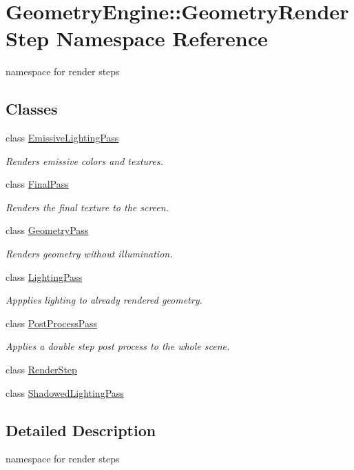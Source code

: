 \hypertarget{namespace_geometry_engine_1_1_geometry_render_step}{}\section{Geometry\+Engine\+::Geometry\+Render\+Step Namespace Reference}
\label{namespace_geometry_engine_1_1_geometry_render_step}


namespace for render steps  


\subsection*{Classes}
\begin{DoxyCompactItemize}
\item 
class \mbox{\hyperlink{class_geometry_engine_1_1_geometry_render_step_1_1_emissive_lighting_pass}{Emissive\+Lighting\+Pass}}
\begin{DoxyCompactList}\small\item\em Renders emissive colors and textures. \end{DoxyCompactList}\item 
class \mbox{\hyperlink{class_geometry_engine_1_1_geometry_render_step_1_1_final_pass}{Final\+Pass}}
\begin{DoxyCompactList}\small\item\em Renders the final texture to the screen. \end{DoxyCompactList}\item 
class \mbox{\hyperlink{class_geometry_engine_1_1_geometry_render_step_1_1_geometry_pass}{Geometry\+Pass}}
\begin{DoxyCompactList}\small\item\em Renders geometry without illumination. \end{DoxyCompactList}\item 
class \mbox{\hyperlink{class_geometry_engine_1_1_geometry_render_step_1_1_lighting_pass}{Lighting\+Pass}}
\begin{DoxyCompactList}\small\item\em Appplies lighting to already rendered geometry. \end{DoxyCompactList}\item 
class \mbox{\hyperlink{class_geometry_engine_1_1_geometry_render_step_1_1_post_process_pass}{Post\+Process\+Pass}}
\begin{DoxyCompactList}\small\item\em Applies a double step post process to the whole scene. \end{DoxyCompactList}\item 
class \mbox{\hyperlink{class_geometry_engine_1_1_geometry_render_step_1_1_render_step}{Render\+Step}}
\item 
class \mbox{\hyperlink{class_geometry_engine_1_1_geometry_render_step_1_1_shadowed_lighting_pass}{Shadowed\+Lighting\+Pass}}
\end{DoxyCompactItemize}


\subsection{Detailed Description}
namespace for render steps 